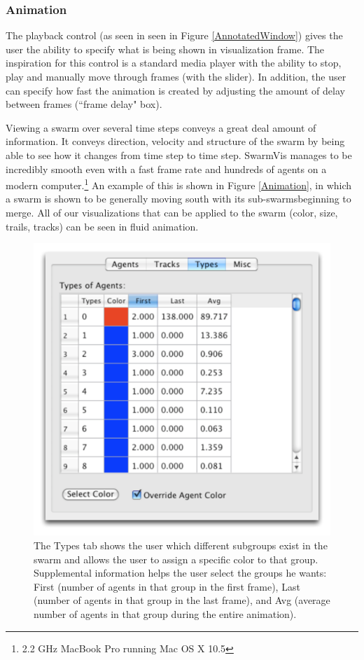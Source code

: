 \documentclass[conference]{IEEEtran}
\begin{document}
\subsubsection{Animation}

The playback control (as seen in  seen in Figure \ref{AnnotatedWindow})
gives the user the ability to specify what is being shown in visualization frame.
The inspiration for this control is a standard media player with the ability to stop,
play and manually move through frames (with the slider).
In addition, the user can specify how fast the animation is created by adjusting the amount of delay between
frames (``frame delay" box).

Viewing a swarm over several time steps conveys a great deal amount of information. It conveys direction,
velocity and structure of the swarm by being able to see how it changes from time step to time step.
SwarmVis manages to be incredibly smooth even with a fast frame rate and hundreds of agents on a modern
computer.\footnote{2.2 GHz MacBook Pro running Mac OS X 10.5}
An example of this is shown in Figure \ref{Animation}, in which a swarm is shown to be
generally moving south with its sub-swarmsbeginning to merge.
All of our visualizations  that can be applied to the swarm (color, size, trails, tracks) can be seen in fluid animation.








\begin{figure}
\centering
\includegraphics[scale=.5]{images/typestab.pdf}
\caption{
The Types tab shows the user which different subgroups exist in the swarm and allows the user to assign a specific
color to that group. Supplemental information helps the user
select the groups he wants: First (number of agents in that group in the first frame),
Last (number of agents in that group in the last frame), and Avg (average number of agents in that group during
the entire animation).}
\label{TypesTab}
\end{figure}
\end{document}
